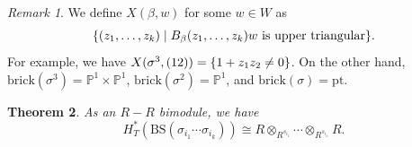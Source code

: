 \documentclass[leqno, openany]{memoir}
\newtheorem{thm}{Theorem}[section]
\theoremstyle{definition}
\theoremstyle{remark}
\newtheorem{rmk}[thm]{Remark}
\theoremstyle{plain}
\theoremstyle{definition}
\theoremstyle{remark}
\renewcommand{\P}{\mathbb{P}}
\newcommand{\mr}[1]{\mathrm{#1}}
\newcommand{\1}{\mathbf{1}}
\newcommand{\2}{\mathbf{2}}
\newcommand{\3}{\mathbf{3}}
\begin{document}
\begin{rmk}
    We define $X(\beta, w)$ for some $w \in W$ as
    \[ \qty{(z_1, \ldots, z_k) \mid B_{\beta}(z_1, \ldots, z_k) w \text{ is upper triangular}}. \]
    For example, we have $X(\sigma^3, (12)) = \qty{1 + z_1 z_2 \neq 0}$. On the other hand, $\mr{brick}(\sigma^3) = \P^1 \times \P^1$, $\mr{brick}(\sigma^2) = \P^1$, and $\mr{brick}(\sigma) = \mr{pt}$.
\end{rmk}

\begin{thm}
    As an $R-R$ bimodule, we have
    \[ H_T^*(\mr{BS}(\sigma_{i_1} \cdots \sigma_{i_k})) \cong R \otimes_{R^{s_{i_1}}} \cdots \otimes_{R^{s_{i_n}}} R. \]
\end{thm}
\end{document}
